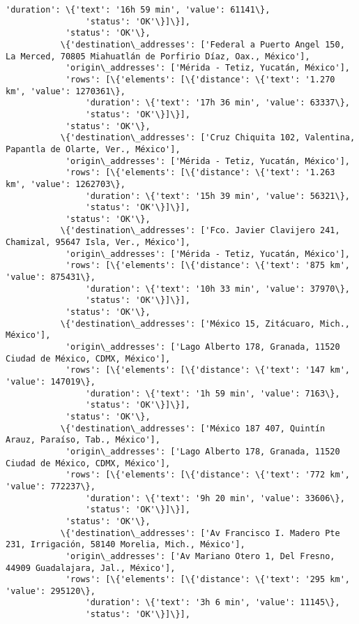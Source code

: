 \documentclass[11pt]{article}
\begin{document}
\begin{Verbatim}[commandchars=\\\{\}]
                'duration': \{'text': '16h 59 min', 'value': 61141\},
                'status': 'OK'\}]\}],
            'status': 'OK'\},
           \{'destination\_addresses': ['Federal a Puerto Angel 150, La Merced, 70805 Miahuatlán de Porfirio Díaz, Oax., México'],
            'origin\_addresses': ['Mérida - Tetiz, Yucatán, México'],
            'rows': [\{'elements': [\{'distance': \{'text': '1.270 km', 'value': 1270361\},
                'duration': \{'text': '17h 36 min', 'value': 63337\},
                'status': 'OK'\}]\}],
            'status': 'OK'\},
           \{'destination\_addresses': ['Cruz Chiquita 102, Valentina, Papantla de Olarte, Ver., México'],
            'origin\_addresses': ['Mérida - Tetiz, Yucatán, México'],
            'rows': [\{'elements': [\{'distance': \{'text': '1.263 km', 'value': 1262703\},
                'duration': \{'text': '15h 39 min', 'value': 56321\},
                'status': 'OK'\}]\}],
            'status': 'OK'\},
           \{'destination\_addresses': ['Fco. Javier Clavijero 241, Chamizal, 95647 Isla, Ver., México'],
            'origin\_addresses': ['Mérida - Tetiz, Yucatán, México'],
            'rows': [\{'elements': [\{'distance': \{'text': '875 km', 'value': 875431\},
                'duration': \{'text': '10h 33 min', 'value': 37970\},
                'status': 'OK'\}]\}],
            'status': 'OK'\},
           \{'destination\_addresses': ['México 15, Zitácuaro, Mich., México'],
            'origin\_addresses': ['Lago Alberto 178, Granada, 11520 Ciudad de México, CDMX, México'],
            'rows': [\{'elements': [\{'distance': \{'text': '147 km', 'value': 147019\},
                'duration': \{'text': '1h 59 min', 'value': 7163\},
                'status': 'OK'\}]\}],
            'status': 'OK'\},
           \{'destination\_addresses': ['México 187 407, Quintín Arauz, Paraíso, Tab., México'],
            'origin\_addresses': ['Lago Alberto 178, Granada, 11520 Ciudad de México, CDMX, México'],
            'rows': [\{'elements': [\{'distance': \{'text': '772 km', 'value': 772237\},
                'duration': \{'text': '9h 20 min', 'value': 33606\},
                'status': 'OK'\}]\}],
            'status': 'OK'\},
           \{'destination\_addresses': ['Av Francisco I. Madero Pte 231, Irrigación, 58140 Morelia, Mich., México'],
            'origin\_addresses': ['Av Mariano Otero 1, Del Fresno, 44909 Guadalajara, Jal., México'],
            'rows': [\{'elements': [\{'distance': \{'text': '295 km', 'value': 295120\},
                'duration': \{'text': '3h 6 min', 'value': 11145\},
                'status': 'OK'\}]\}],

\end{Verbatim}
\end{document}
